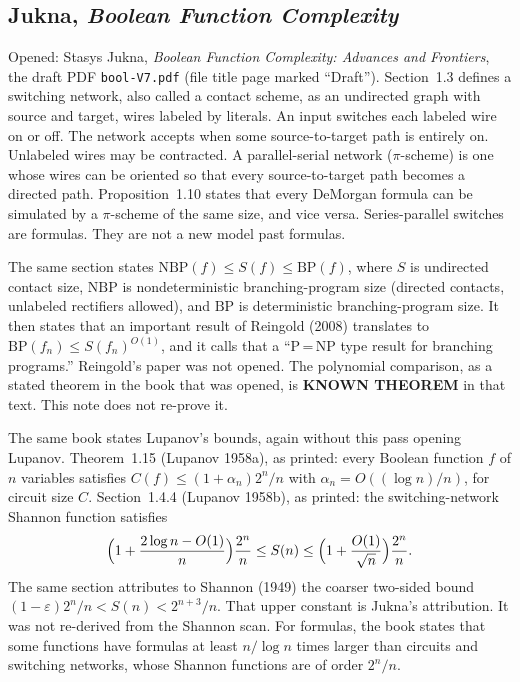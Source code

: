 \documentclass[11pt]{article}
\begin{document}
\subsection*{Jukna, \emph{Boolean Function Complexity}}
Opened: Stasys Jukna, \emph{Boolean Function Complexity: Advances and Frontiers}, the draft PDF \texttt{bool-V7.pdf} (file title page marked ``Draft'').
Section~1.3 defines a switching network, also called a contact scheme, as an undirected graph with source and target, wires labeled by literals.
An input switches each labeled wire on or off.
The network accepts when some source-to-target path is entirely on.
Unlabeled wires may be contracted.
A parallel-serial network (\(\pi\)-scheme) is one whose wires can be oriented so that every source-to-target path becomes a directed path.
Proposition~1.10 states that every DeMorgan formula can be simulated by a \(\pi\)-scheme of the same size, and vice versa.
Series-parallel switches are formulas.
They are not a new model past formulas.

The same section states \(\mathrm{NBP}(f)\le S(f)\le\mathrm{BP}(f)\), where \(S\) is undirected contact size, \(\mathrm{NBP}\) is nondeterministic branching-program size (directed contacts, unlabeled rectifiers allowed), and \(\mathrm{BP}\) is deterministic branching-program size.
It then states that an important result of Reingold (2008) translates to \(\mathrm{BP}(f_n)\le S(f_n)^{O(1)}\), and it calls that a ``P\,=\,NP type result for branching programs.''
Reingold's paper was not opened.
The polynomial comparison, as a stated theorem in the book that was opened, is \textbf{KNOWN THEOREM} in that text.
This note does not re-prove it.

The same book states Lupanov's bounds, again without this pass opening Lupanov.
Theorem~1.15 (Lupanov 1958a), as printed: every Boolean function \(f\) of \(n\) variables satisfies \(C(f)\le(1+\alpha_n)2^n/n\) with \(\alpha_n=O((\log n)/n)\), for circuit size \(C\).
Section~1.4.4 (Lupanov 1958b), as printed: the switching-network Shannon function satisfies
\[
\Bigl(1+\frac{2\log n-O(1)}{n}\Bigr)\frac{2^n}{n}
\le S(n)
\le\Bigl(1+\frac{O(1)}{\sqrt{n}}\Bigr)\frac{2^n}{n}.
\]
The same section attributes to Shannon (1949) the coarser two-sided bound \((1-\varepsilon)2^n/n<S(n)<2^{n+3}/n\).
That upper constant is Jukna's attribution.
It was not re-derived from the Shannon scan.
For formulas, the book states that some functions have formulas at least \(n/\log n\) times larger than circuits and switching networks, whose Shannon functions are of order \(2^n/n\).
\end{document}
